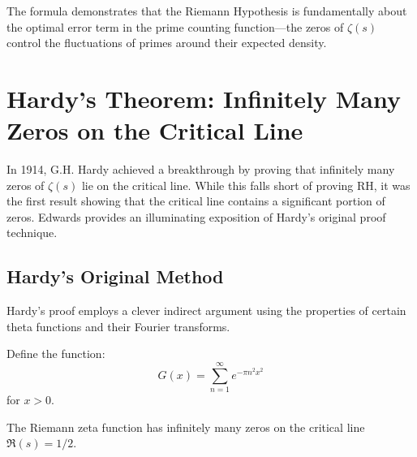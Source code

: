 The formula demonstrates that the Riemann Hypothesis is fundamentally about the optimal error term in the prime counting function—the zeros of $\zeta(s)$ control the fluctuations of primes around their expected density.

\section{Hardy's Theorem: Infinitely Many Zeros on the Critical Line}

In 1914, G.H. Hardy \cite{hardy1914} achieved a breakthrough by proving that infinitely many zeros of $\zeta(s)$ lie on the critical line. While this falls short of proving RH, it was the first result showing that the critical line contains a significant portion of zeros. Edwards \cite{edwards1974} provides an illuminating exposition of Hardy's original proof technique.

\subsection{Hardy's Original Method}

Hardy's proof employs a clever indirect argument using the properties of certain theta functions and their Fourier transforms.

\begin{definition}
Define the function:
\begin{equation}
G(x) = \sum_{n=1}^{\infty} e^{-\pi n^2 x^2}
\end{equation}
for $x > 0$.
\end{definition}

\begin{theorem}[Hardy 1914]
The Riemann zeta function has infinitely many zeros on the critical line $\Re(s) = 1/2$.
\end{theorem}

